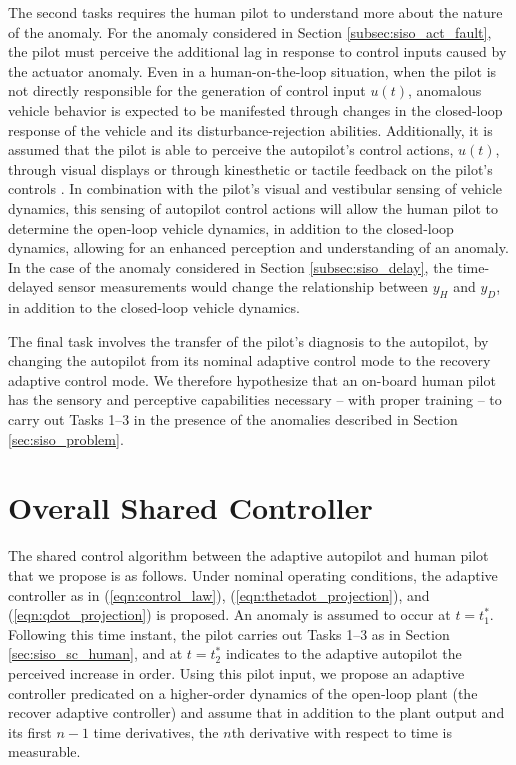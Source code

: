 The second tasks requires the human pilot to understand more about the nature of the anomaly. For the anomaly considered in Section \ref{subsec:siso_act_fault}, the pilot must perceive the additional lag in response to control inputs caused by the actuator anomaly. Even in a human-on-the-loop situation, when the pilot is not directly responsible for the generation of control input $u(t)$, anomalous vehicle behavior is expected to be manifested through changes in the closed-loop response of the vehicle and its disturbance-rejection abilities. Additionally, it is assumed that the pilot is able to perceive the autopilot's control actions, $u(t)$, through visual displays or through kinesthetic or tactile feedback on the pilot's controls \cite{tan1994human, yang2007development}. In combination with the pilot's visual and vestibular sensing of vehicle dynamics, this sensing of autopilot control actions will allow the human pilot to determine the open-loop vehicle dynamics, in addition to the closed-loop dynamics, allowing for an enhanced perception and understanding of an anomaly. In the case of the anomaly considered in Section \ref{subsec:siso_delay}, the time-delayed sensor measurements would change the relationship between $y_{H}$ and $y_{D}$, in addition to the closed-loop vehicle dynamics. 

The final task involves the transfer of the pilot's diagnosis to the autopilot, by changing the autopilot from its nominal adaptive control mode to the recovery adaptive control mode. We therefore hypothesize that an on-board human pilot has the sensory and perceptive capabilities necessary -- with proper training -- to carry out Tasks 1--3 in the presence of the anomalies described in Section \ref{sec:siso_problem}. 

\section{Overall Shared Controller}\label{sec:siso_sc_overall}

The shared control algorithm between the adaptive autopilot and human pilot that we propose is as follows. Under nominal operating conditions, the adaptive controller as in (\ref{eqn:control_law}), (\ref{eqn:thetadot_projection}), and (\ref{eqn:qdot_projection}) is proposed. An anomaly is assumed to occur at $t=t_1^*$. Following this time instant, the pilot carries out Tasks 1--3 as in Section \ref{sec:siso_sc_human}, and at $t=t_2^*$ indicates to the adaptive autopilot the perceived increase in order. Using this pilot input, we propose an adaptive controller predicated on a higher-order dynamics of the open-loop plant (the recover adaptive controller) and assume that in addition to the plant output and its first $n-1$ time derivatives, the $n$th derivative with respect to time is measurable. 

